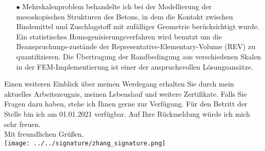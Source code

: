 \begin{adjustwidth}{0cm}{1cm}
\begin{adjustwidth}{0.5cm}{0cm}
\begin{itemize}
	\item[$\bullet$] Mehrskalenproblem behandelte ich bei der Modellierung der mesoskopischen Strukturen des Betons, in dem die Kontakt zwischen  Bindemittel und Zuschlagstoff mit zufälliger Geometrie berücksichtigt wurde. Ein statistisches Homogenisierungsverfahren wird benutzt um die Beanspruchungs-zustände der Representative-Elementary-Volume (REV) zu quantifizieren. Die Übertragung der Randbedingung aus verschiedenen Skalen in der FEM-Implementierung ist  einer der  anspruchsvollen Lösungsansätze. \\[-0.5em] 
   			\end{itemize}
		\end{adjustwidth}
	Einen weiteren Einblick über meinen Werdegang erhalten Sie durch mein aktuelles Arbeitszeugnis, meinen Lebenslauf und weitere Zertifikate. Falls Sie Fragen dazu haben, stehe ich Ihnen gerne zur Verfügung. Für den Betritt der Stelle bin ich am 01.01.2021 verfügbar.	Auf Ihre Rückmeldung würde ich mich sehr freuen.\\[1.5em] 
	Mit freundlichen Grüßen,\\[1em]
	\texttt{[image: ../../signature/zhang\_signature.png]}%
\end{adjustwidth}

